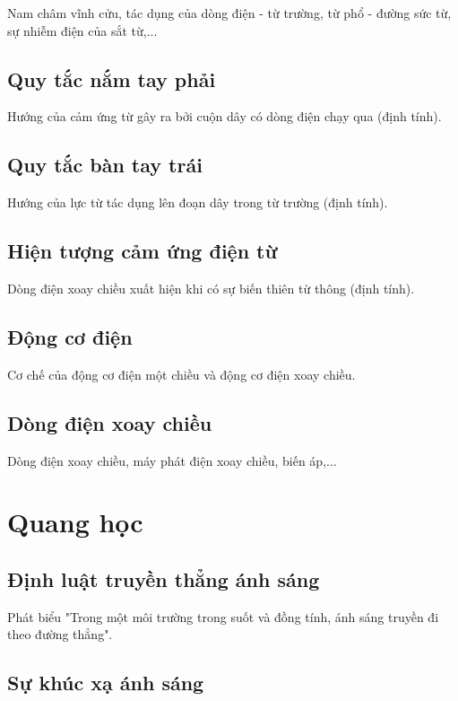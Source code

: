 \documentclass{article}
\begin{document}
\begin{multicols}{2}
Nam châm vĩnh cửu, tác dụng của dòng điện - từ trường, từ phổ - đường sức từ, sự nhiễm điện của sắt từ,...

\subsection{Quy tắc nắm tay phải}

Hướng của cảm ứng từ gây ra bởi cuộn dây có dòng điện chạy qua (định tính).

\subsection{Quy tắc bàn tay trái}

Hướng của lực từ tác dụng lên đoạn dây trong từ trường (định tính).

\subsection{Hiện tượng cảm ứng điện từ}

Dòng điện xoay chiều xuất hiện khi có sự biến thiên từ thông (định tính).

\subsection{Động cơ điện}

Cơ chế của động cơ điện một chiều và động cơ điện xoay chiều.

\subsection{Dòng điện xoay chiều}

Dòng điện xoay chiều, máy phát điện xoay chiều, biến áp,...

\section{Quang học}

\subsection{Định luật truyền thẳng ánh sáng}

Phát biểu "Trong một môi trường trong suốt và đồng tính, ánh sáng truyền đi theo đường thẳng".

\subsection{Sự khúc xạ ánh sáng}


\end{multicols}
\end{document}
